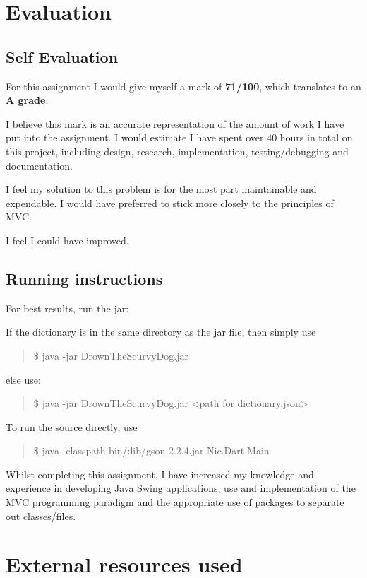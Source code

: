 \documentclass[a4paper, 11pt]{article}
\begin{document}
\section{Evaluation}

\subsection{Self Evaluation}

For this assignment I would give myself a mark of \textbf{71/100}, which translates to an \textbf{A grade}.

I believe this mark is an accurate representation of the amount of work I have put into the assignment. I would estimate I have spent over 40 hours in total on this project, including design, research, implementation, testing/debugging and documentation.

I feel my solution to this problem is for the most part maintainable and expendable. I would have preferred to stick more closely to the principles of MVC. 

I feel I could have improved.

\subsection{Running instructions}

For best results, run the jar:

If the dictionary is in the same directory as the jar file, then simply use
\begin{quote}
\$ java -jar DrownTheScurvyDog.jar
\end{quote}

else use:
\begin{quote}
\$ java -jar DrownTheScurvyDog.jar \textless path for dictionary.json\textgreater
\end{quote}

To run the source directly, use
\begin{quote}
\$ java -classpath bin/:lib/gson-2.2.4.jar Nic.Dart.Main
\end{quote}




\vspace{\baselineskip}

Whilst completing this assignment, I have increased my knowledge and experience in developing Java Swing applications, use and implementation of the MVC programming paradigm and the appropriate use of packages to separate out classes/files.
\section{External resources used}
\end{document}
